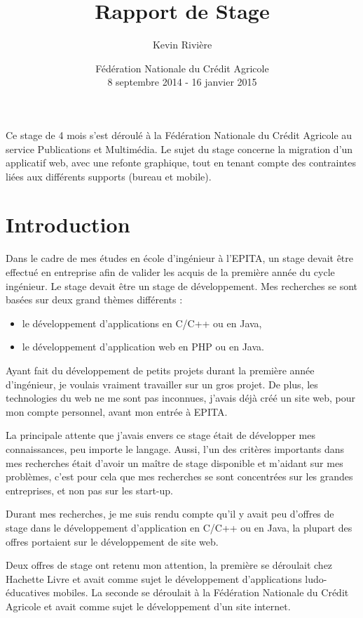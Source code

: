 \documentclass[12pt,a4paper]{article}
\author{Kevin Rivière}
\title{Rapport de Stage}
\date{Fédération Nationale du Crédit Agricole\\ 8 septembre 2014 - 16 janvier 2015}
\begin{document}
\maketitle
Ce stage de 4 mois s'est déroulé à la Fédération Nationale du Crédit Agricole au service Publications et Multimédia. Le sujet du stage concerne la migration d'un applicatif web, avec une refonte graphique, tout en tenant compte des contraintes liées aux différents supports (bureau et mobile).
\thispagestyle{empty}
\setcounter{page}{0}
\newpage

\tableofcontents
\thispagestyle{empty}
\setcounter{page}{0}
\newpage

\section{Introduction}
Dans le cadre de mes études en école d'ingénieur à l'EPITA, un stage devait être effectué en entreprise afin de valider les acquis de la première année du cycle ingénieur. Le stage devait être un stage de développement. Mes recherches se sont basées sur deux grand thèmes différents : 
\begin{itemize}
\item le développement d'applications en C/C++ ou en Java,
\item le développement d'application web en \gls{PHP} ou en Java.
\end{itemize}\par
Ayant fait du développement de petits projets durant la première année d'ingénieur, je voulais vraiment travailler sur un gros projet. De plus, les technologies du web ne me sont pas inconnues, j'avais déjà créé un site web, pour mon compte personnel, avant mon entrée à EPITA.\par 
\medskip
La principale attente que j'avais envers ce stage était de développer mes connaissances, peu importe le langage. Aussi, l'un des critères importants dans mes recherches était d'avoir un maître de stage disponible et m'aidant sur mes problèmes, c'est pour cela que mes recherches se sont concentrées sur les grandes entreprises, et non pas sur les start-up.\par
Durant mes recherches, je me suis rendu compte qu'il y avait peu d'offres de stage dans le développement d'application en C/C++ ou en Java, la plupart des offres portaient sur le développement de site web. \par 
\medskip
Deux offres de stage ont retenu mon attention, la première se déroulait chez Hachette Livre et avait comme sujet le développement d'applications ludo-éducatives mobiles. La seconde se déroulait à la Fédération Nationale du Crédit Agricole et avait comme sujet le développement d'un site internet.\par 
\end{document}
